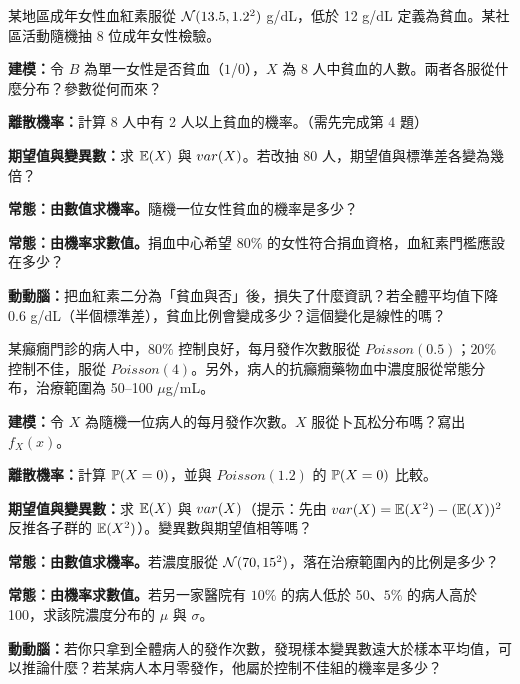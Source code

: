 \members
\begin{scenario}
    某地區成年女性血紅素服從 $\mathcal{N}(13.5, 1.2^2)$ g/dL，低於 12 g/dL 定義為貧血。某社區活動隨機抽 8 位成年女性檢驗。
\end{scenario}
\begin{questions}
    \item \textbf{建模：}令 $B$ 為單一女性是否貧血（$1$/$0$），$X$ 為 8 人中貧血的人數。兩者各服從什麼分布？參數從何而來？ \blank
    \item \textbf{離散機率：}計算 8 人中有 2 人以上貧血的機率。（需先完成第 4 題） \blank
    \item \textbf{期望值與變異數：}求 $\mathbb{E}(X)$ 與 $var(X)$。若改抽 80 人，期望值與標準差各變為幾倍？ \blank
    \item \textbf{常態：由數值求機率。}隨機一位女性貧血的機率是多少？ \blank
    \item \textbf{常態：由機率求數值。}捐血中心希望 $80\%$ 的女性符合捐血資格，血紅素門檻應設在多少？ \blank
    \item \textbf{動動腦：}把血紅素二分為「貧血與否」後，損失了什麼資訊？若全體平均值下降 0.6 g/dL（半個標準差），貧血比例會變成多少？這個變化是線性的嗎？ \blank
\end{questions}
\newpage

\members
\begin{scenario}
    某癲癇門診的病人中，$80\%$ 控制良好，每月發作次數服從 $Poisson(0.5)$；$20\%$ 控制不佳，服從 $Poisson(4)$。另外，病人的抗癲癇藥物血中濃度服從常態分布，治療範圍為 50--100 $\mu$g/mL。
\end{scenario}
\begin{questions}
    \item \textbf{建模：}令 $X$ 為隨機一位病人的每月發作次數。$X$ 服從卜瓦松分布嗎？寫出 $f_X(x)$。 \blank
    \item \textbf{離散機率：}計算 $\mathbb{P}(X=0)$，並與 $Poisson(1.2)$ 的 $\mathbb{P}(X=0)$ 比較。 \blank
    \item \textbf{期望值與變異數：}求 $\mathbb{E}(X)$ 與 $var(X)$（提示：先由 $var(X) = \mathbb{E}(X^2)-(\mathbb{E}(X))^2$ 反推各子群的 $\mathbb{E}(X^2)$）。變異數與期望值相等嗎？ \blank
    \item \textbf{常態：由數值求機率。}若濃度服從 $\mathcal{N}(70, 15^2)$，落在治療範圍內的比例是多少？ \blank
    \item \textbf{常態：由機率求數值。}若另一家醫院有 $10\%$ 的病人低於 50、$5\%$ 的病人高於 100，求該院濃度分布的 $\mu$ 與 $\sigma$。 \blank
    \item \textbf{動動腦：}若你只拿到全體病人的發作次數，發現樣本變異數遠大於樣本平均值，可以推論什麼？若某病人本月零發作，他屬於控制不佳組的機率是多少？ \blank
\end{questions}
\newpage

